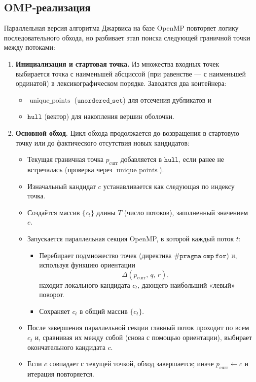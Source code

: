 \documentclass[12pt,a4paper]{article}
\begin{document}
\subsection*{OMP-реализация}

Параллельная версия алгоритма Джарвиса на базе OpenMP повторяет логику последовательного обхода, но разбивает этап поиска следующей граничной точки между потоками:

\begin{enumerate}
  \item \textbf{Инициализация и стартовая точка.}  
    Из множества входных точек выбирается точка с наименьшей абсциссой (при равенстве — с наименьшей ординатой) в лексикографическом порядке. Заводятся два контейнера:  
    \begin{itemize}
      \item \(\operatorname{unique\_points}\) (\(\texttt{unordered\_set}\)) для отсечения дубликатов и  
      \item \(\texttt{hull}\) (вектор) для накопления вершин оболочки.  
    \end{itemize}

  \item \textbf{Основной обход.}  
    Цикл обхода продолжается до возвращения в стартовую точку или до фактического отсутствия новых кандидатов:
    \begin{itemize}
      \item Текущая граничная точка \(p_{\mathrm{curr}}\) добавляется в \(\texttt{hull}\), если ранее не встречалась (проверка через \(\operatorname{unique\_points}\)).
      \item Изначальный кандидат \(c\) устанавливается как следующая по индексу точка.
      \item Создаётся массив \(\{\!c_t\}\) длины \(T\) (число потоков), заполненный значением \(c\).
      \item Запускается параллельная секция OpenMP, в которой каждый поток \(t\):
        \begin{itemize}
          \item Перебирает подмножество точек (директива \(\mathtt{\#pragma\ omp\ for}\)) и, используя функцию ориентации
            \[
              \Delta(p_{\mathrm{curr}},\,q,\,r),
            \]
            находит локального кандидата \(c_t\), дающего наибольший «левый» поворот.
          \item Сохраняет \(c_t\) в общий массив \(\{\!c_t\}\).
        \end{itemize}
      \item После завершения параллельной секции главный поток проходит по всем \(c_t\) и, сравнивая их между собой (снова с помощью ориентации), выбирает окончательного кандидата \(c\).
      \item Если \(c\) совпадает с текущей точкой, обход завершается; иначе \(p_{\mathrm{curr}}\gets c\) и итерация повторяется.
    \end{itemize}


\end{enumerate}
\end{document}
